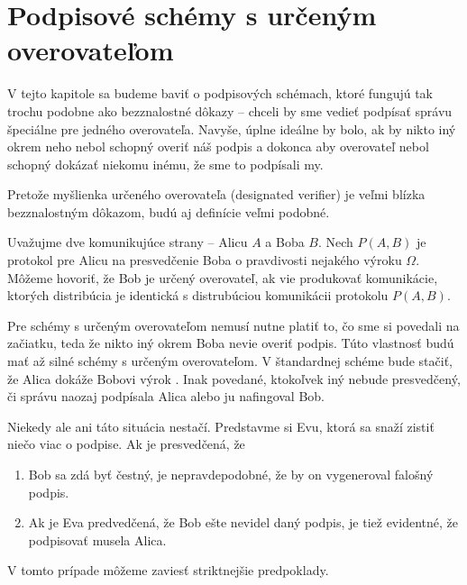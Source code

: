 \section{Podpisové schémy s určeným overovateľom}

V tejto kapitole sa budeme baviť o podpisových schémach, ktoré fungujú
tak trochu podobne ako bezznalostné dôkazy -- chceli by sme vedieť
podpísať správu špeciálne pre jedného overovateľa. Navyše, úplne
ideálne by bolo, ak by nikto iný okrem neho nebol schopný overiť náš
podpis a dokonca aby overovateľ nebol schopný dokázať niekomu inému,
že sme to podpísali my.

Pretože myšlienka určeného overovateľa (designated verifier) je veľmi
blízka bezznalostným dôkazom, budú aj definície veľmi podobné.

\begin{definicia}
    Uvažujme dve komunikujúce strany -- Alicu $A$ a Boba $B$. Nech
    $P(A,B)$ je protokol pre Alicu na presvedčenie
    Boba o pravdivosti nejakého výroku $\Omega$. Môžeme hovoriť, že
    Bob je určený overovateľ, ak vie produkovať komunikácie, ktorých
    distribúcia je identická s distrubúciou komunikácii protokolu
    $P(A,B)$.
\end{definicia}

\begin{poznamka}
    Pre schémy s určeným overovateľom nemusí nutne platiť to, čo sme si
    povedali na začiatku, teda že nikto iný okrem Boba nevie overiť podpis.
    Túto vlastnosť budú mať až silné schémy s určeným overovateľom.
    V štandardnej schéme bude stačiť, že Alica dokáže Bobovi výrok
    .
    Inak povedané, ktokoľvek iný nebude presvedčený, či správu naozaj
    podpísala Alica alebo ju nafingoval Bob.
\end{poznamka}

Niekedy ale ani táto situácia nestačí. Predstavme si Evu, ktorá sa
snaží zistiť niečo viac o podpise. Ak je presvedčená, že
\begin{enumerate}
    \item Bob sa zdá byť čestný, je nepravdepodobné, že by on
    vygeneroval falošný podpis.

    \item Ak je Eva predvedčená, že Bob ešte nevidel daný podpis, je
    tiež evidentné, že podpisovať musela Alica.
\end{enumerate}

V tomto prípade môžeme zaviesť striktnejšie predpoklady.

